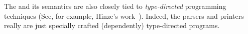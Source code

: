 
The \ddc{} and its semantics are also closely tied to 
{\em type-directed} programming techniques
(See, for example, Hinze's work~\cite{hinze:generic}).
Indeed, the \ddc{} parsers and printers really are just
specially crafted (dependently) type-directed programs.




